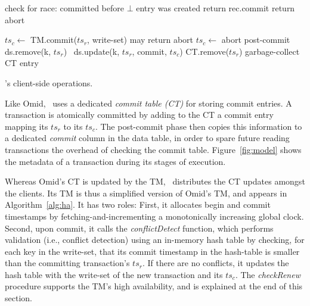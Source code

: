 \begin{algorithm}[t]
\begin{algorithmic}
{ 				   
 				 	\State \Comment check for race: committed before $\bot$ entry was created
 				 	  return rec.commit \EndIf
 				 	\State return abort 				
				\EndIf
%
	   	\EndProcedure
}


      	\State $ts_c \leftarrow$ TM.commit($ts_r$, write-set) \Comment may return abort
   		 	\State $ts_c \leftarrow$ abort 
   		 \EndIf
	\EndIf
	\State \Comment post-commit
			 ds.remove(k, $ts_r$)  	
			\Else\ ds.update(k, $ts_r$, commit, $ts_c$)
			\EndIf
	\EndFor
	\State CT.remove($ts_r$) \Comment garbage-collect CT entry
\EndProcedure
      
  \end{algorithmic}
  \caption{\sysll's client-side operations.} 
  \label{fig:get-pseudocode}
\end{algorithm} 

Like Omid, \sysll\ uses a dedicated \emph{commit table (CT)} for storing commit entries.
A transaction is atomically committed by adding to the CT a commit entry mapping its $ts_r$ to its $ts_c$.
The post-commit phase then copies this information to 
a dedicated \emph{commit} column in the data table, in order to spare future reading transactions
 the overhead of checking the commit table. 
 Figure~\ref{fig:model} shows the metadata of a transaction during its stages of execution. 

Whereas Omid's CT is updated by the TM, \sysll\ distributes the CT updates amongst the clients.
Its TM is thus a simplified version of Omid's TM, and appears  in Algorithm~\ref{alg:ha}. It has two roles:
First, it allocates begin and commit timestamps by fetching-and-incrementing a monotonically increasing global clock.
Second, upon commit, it calls the \emph{conflictDetect} function, which 
performs validation (i.e., conflict detection) using an in-memory hash table
by checking, for each key in the write-set, that its commit timestamp in the hash-table is smaller than the 
committing transaction's $ts_r$. If there are no conflicts, it 
updates the hash table with the write-set of the new transaction and its $ts_c$. 
The  \emph{checkRenew} procedure supports the TM's  high availability, and is explained at the end of this section.



